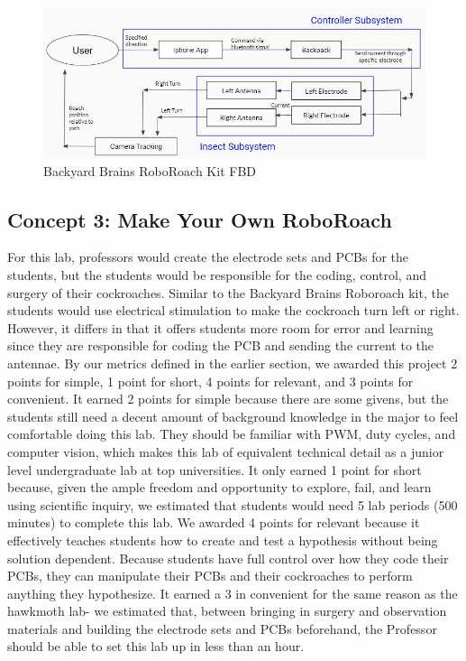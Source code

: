 \documentclass{article}
\begin{document}
\begin{figure}[ht!]
\centering
\includegraphics[scale=0.45]{fbd2.JPG}
\caption{Backyard Brains RoboRoach Kit FBD}
\label{fig:FBD2}
\end{figure}

\subsection{Concept 3: Make Your Own RoboRoach}
\par For this lab, professors would create the electrode sets and PCBs for the students, but the students would be responsible for the coding, control, and surgery of their cockroaches. Similar to the Backyard Brains Roboroach kit, the students would use electrical stimulation to make the cockroach turn left or right. However, it differs in that it offers students more room for error and learning since they are responsible for coding the PCB and sending the current to the antennae. By our metrics defined in the earlier section, we awarded this project 2 points for simple, 1 point for short, 4 points for relevant, and 3 points for convenient. It earned 2 points for simple because there are some givens, but the students still need a decent amount of background knowledge in the major to feel comfortable doing this lab. They should be familiar with PWM, duty cycles, and computer vision, which makes this lab of equivalent technical detail as a junior level undergraduate lab at top universities. It only earned 1 point for short because, given the ample freedom and opportunity to explore, fail, and learn using scientific inquiry, we estimated that students would need 5 lab periods (500 minutes) to complete this lab. We awarded 4 points for relevant because it effectively teaches students how to create and test a hypothesis without being solution dependent. Because students have full control over how they code their PCBs, they can manipulate their PCBs and their cockroaches to perform anything they hypothesize. It earned a 3 in convenient for the same reason as the hawkmoth lab- we estimated that, between bringing in surgery and observation materials and building the electrode sets and PCBs beforehand, the Professor should be able to set this lab up in less than an hour.
\end{document}
